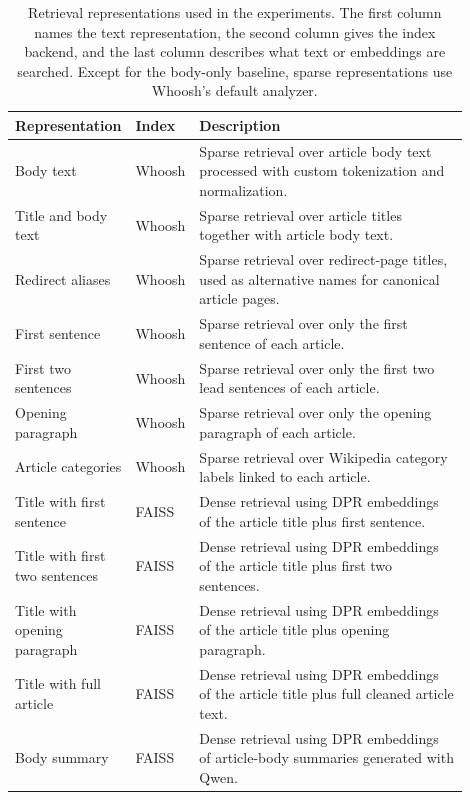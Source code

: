 \documentclass[11pt]{article}
\begin{document}
\begin{table}[t]
  \centering
  \scriptsize
  \caption{Retrieval representations used in the experiments. The first column names the text representation, the second column gives the index backend, and the last column describes what text or embeddings are searched. Except for the body-only baseline, sparse representations use Whoosh's default analyzer.}
  \label{tab:index-inventory}
  \begin{tabular}{p{0.22\linewidth}p{0.08\linewidth}p{0.60\linewidth}}
    \toprule
    \textbf{Representation} & \textbf{Index} & \textbf{Description} \\
    \midrule
    Body text & Whoosh & Sparse retrieval over article body text processed with custom tokenization and normalization. \\
    Title and body text & Whoosh & Sparse retrieval over article titles together with article body text. \\
    Redirect aliases & Whoosh & Sparse retrieval over redirect-page titles, used as alternative names for canonical article pages. \\
    First sentence & Whoosh & Sparse retrieval over only the first sentence of each article. \\
    First two sentences & Whoosh & Sparse retrieval over only the first two lead sentences of each article. \\
    Opening paragraph & Whoosh & Sparse retrieval over only the opening paragraph of each article. \\
    Article categories & Whoosh & Sparse retrieval over Wikipedia category labels linked to each article. \\
    Title with first sentence & FAISS & Dense retrieval using DPR embeddings of the article title plus first sentence. \\
    Title with first two sentences & FAISS & Dense retrieval using DPR embeddings of the article title plus first two sentences. \\
    Title with opening paragraph & FAISS & Dense retrieval using DPR embeddings of the article title plus opening paragraph. \\
    Title with full article & FAISS & Dense retrieval using DPR embeddings of the article title plus full cleaned article text. \\
    Body summary & FAISS & Dense retrieval using DPR embeddings of article-body summaries generated with Qwen. \\
    \bottomrule
  \end{tabular}
\end{table}
\end{document}
